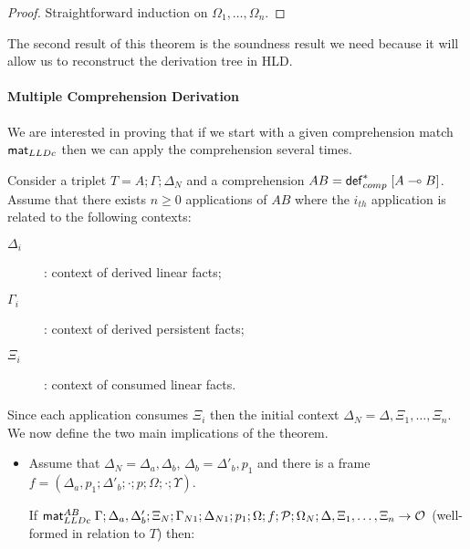\begin{proof}
Straightforward induction on $\Omega_1, \dotsc, \Omega_n$.
\end{proof}

The second result of this theorem is the soundness result we need because it
will allow us to reconstruct the derivation tree in HLD.


\paragraph{Multiple Comprehension Derivation} We are interested in proving that
if we start with a given comprehension match $\mathsf{mat}_{LLDc}$ then we can apply the
comprehension several times.

\begin{theorem}\label{thm:multiple_comprehension_derivation}
Consider a triplet $T = A; \Gamma; \Delta_{N}$ and a comprehension $AB =
\mathsf{def}_{comp}^{*} \; [A \multimap B]$. Assume that there exists $n \geq 0$ applications of $AB$
where the $i_{th}$ application is related to the following contexts:
\begin{description}
   \item[$\Delta_i$]: context of derived linear facts;
   \item[$\Gamma_i$]: context of derived persistent facts;
   \item[$\Xi_i$]: context of consumed linear facts.
\end{description}

Since each application consumes $\Xi_i$ then the initial context $\Delta_N =
\Delta, \Xi_1, \dotsc, \Xi_n$. We now define the two main implications of the
theorem.

\begin{itemize}[leftmargin=*]
   \item Assume that $\Delta_N = \Delta_a, \Delta_b$, $\Delta_b =
   \Delta'_b, p_1$ and there is a frame $f = (\Delta_a, p_1; \Delta'_b; \cdot;
         p; \Omega; \cdot; \Upsilon)$.

   If $\mathsf{mat}_{LLDc}^{AB} \; \Gamma; \Delta_a, \Delta'_b; \Xi_N; \Gamma_{N1}; \Delta_{N1};
      p_1; \Omega; f; \mathcal{P}; \Omega_N; \Delta, \Xi_1, \dotsc, \Xi_n \rightarrow
      \mathcal{O}$ (well-formed in relation to $T$) then:


\end{itemize}
\end{theorem}
